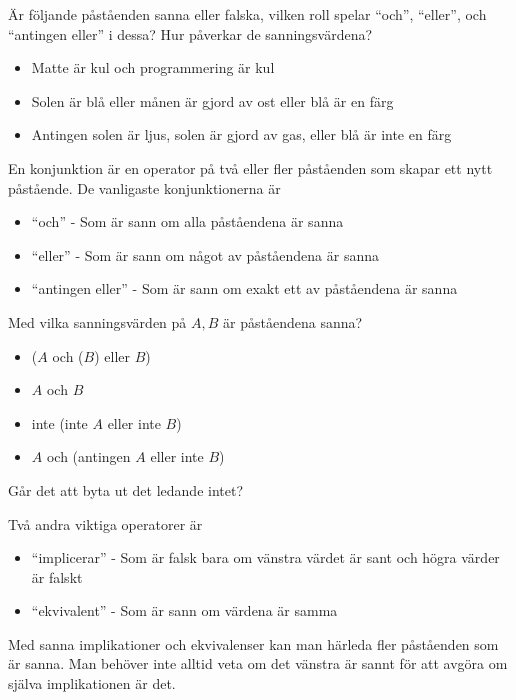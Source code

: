 \begin{problem}
	Är följande påståenden sanna eller falska, vilken roll spelar ``och'', ``eller'', och ``antingen eller'' i dessa? Hur påverkar de sanningsvärdena?
	\begin{itemize}
		\item Matte är kul och programmering är kul
		\item Solen är blå eller månen är gjord av ost eller blå är en färg
		\item Antingen solen är ljus, solen är gjord av gas, eller blå är inte en färg
	\end{itemize}
\end{problem}
	
\begin{definition}[Konjunktion]
	En konjunktion är en operator på två eller fler påståenden som skapar ett nytt påstående. De vanligaste konjunktionerna är
	\begin{itemize}
		\item ``och'' - Som är sann om alla påståendena är sanna
		\item ``eller'' - Som är sann om något av påståendena är sanna
		\item ``antingen eller'' - Som är sann om exakt ett av påståendena är sanna
	\end{itemize}
\end{definition}

\begin{problem}
	Med vilka sanningsvärden på \(A, B\) är påståendena sanna? 
	\begin{itemize}
		\item (\(A\) och (\(B\)) eller \(B\))
		\item \(A\) och \(B\) 
		\item inte (inte \(A\) eller inte \(B\))
		\item \(A\) och (antingen \(A\) eller inte \(B\))
	\end{itemize}
\end{problem}

\begin{problem}
	Går det att byta ut det ledande intet?
\end{problem}


\begin{definition}[Slutledningar]
	Två andra viktiga operatorer är
	\begin{itemize}
		\item ``implicerar'' - Som är falsk bara om vänstra värdet är sant och högra värder är falskt
		\item ``ekvivalent'' - Som är sann om värdena är samma
	\end{itemize}
	Med sanna implikationer och ekvivalenser kan man härleda fler påståenden som är sanna. Man behöver inte alltid veta om det vänstra är sannt för att avgöra om själva implikationen är det.
\end{definition}

